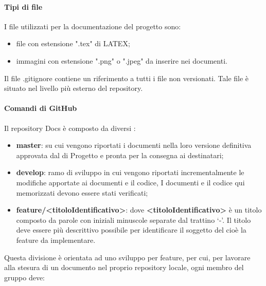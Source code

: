             \paragraph{Tipi di file}
                I file utilizzati per la documentazione del progetto sono:
                \begin{itemize}
                    \item file con estensione ".tex" di LATEX;
                    \item immagini con estensione ".png" o ".jpeg" da inserire nei documenti.
                \end{itemize}
                Il file .gitignore contiene un riferimento a tutti i file non versionati. Tale file è situato nel livello più esterno del repository.
            \paragraph{Comandi di GitHub}
                Il repository Docs è composto da diversi :
                \begin{itemize}
                    \item\textbf{master}: su cui vengono riportati i documenti nella loro versione definitiva approvata dal  di Progetto e pronta per la consegna ai destinatari;
                    \item\textbf{develop}: ramo di sviluppo in cui vengono riportati incrementalmente le modifiche apportate ai documenti e il codice, I documenti e il codice qui memorizzati devono essere stati verificati;
                    \item\textbf{feature/<titoloIdentificativo>}: dove \textbf{<titoloIdentificativo>} è un titolo composto da parole con iniziali minuscole separate dal trattino ‘-’. Il titolo deve essere più descrittivo possibile per identificare il soggetto del  cioè la feature da implementare.
                \end{itemize}
                Questa divisione è orientata ad uno sviluppo per feature, per cui, per lavorare alla stesura di un documento nel proprio repository locale, ogni membro del gruppo deve:
